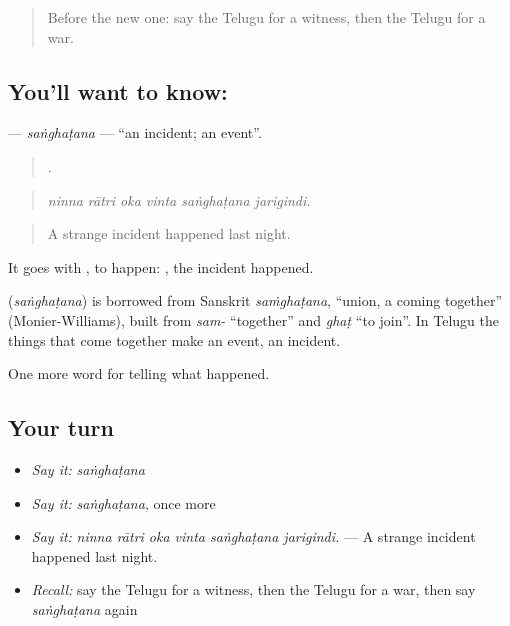 \label{lesson:TE-C326-sanghatana}



\begin{quote}
Before the new one: say the Telugu for a witness, then the Telugu for a war.
\end{quote}

\subsection*{You'll want to know: }
\textbf{} — \emph{saṅghaṭana} — \textquotedblleft{}an incident; an event\textquotedblright{}.

\begin{quote}
     .
\end{quote}

\begin{quote}
\emph{ninna rātri oka vinta saṅghaṭana jarigindi.}
\end{quote}

\begin{quote}
A strange incident happened last night.
\end{quote}

It goes with , to happen:  , the incident happened.

\begin{cousinweb}
\textbf{} (\emph{saṅghaṭana}) is borrowed from Sanskrit \emph{saṁghaṭana}, \textquotedblleft{}union, a coming together\textquotedblright{} (Monier-Williams), built from \emph{sam-} \textquotedblleft{}together\textquotedblright{} and \emph{ghaṭ} \textquotedblleft{}to join\textquotedblright{}. In Telugu the things that come together make an event, an incident.
\end{cousinweb}

\begin{grammarlens}[title={What you've built}]
One more word for telling what happened.
\end{grammarlens}

\subsection*{Your turn}
\begin{itemize}
\raggedright
  \item \emph{Say it:} \emph{saṅghaṭana}
  \item \emph{Say it:} \emph{saṅghaṭana}, once more
  \item \emph{Say it:} \emph{ninna rātri oka vinta saṅghaṭana jarigindi.} — A strange incident happened last night.
  \item \emph{Recall:} say the Telugu for a witness, then the Telugu for a war, then say \emph{saṅghaṭana} again
\end{itemize}

